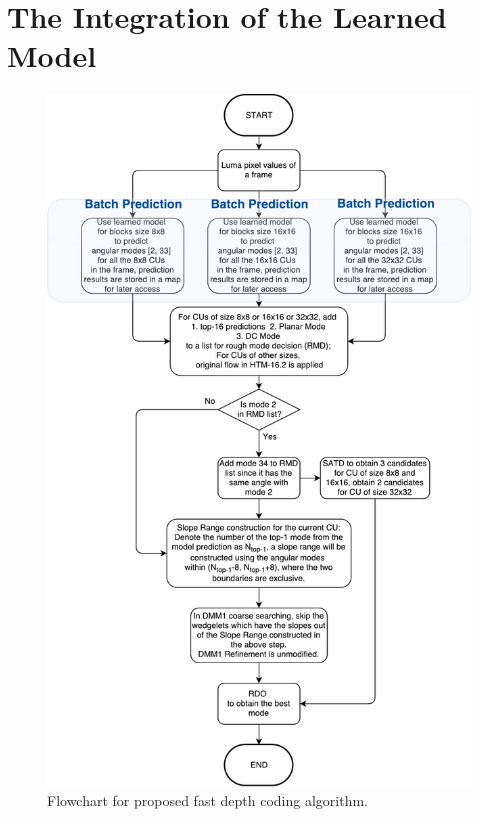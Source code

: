 \section{The Integration of the Learned Model}\label{sec:integration-of-learned-model}
\begin{figure}
    \centering
    \includegraphics[width=\textwidth,height=\textheight,keepaspectratio]{Figures/proposed-fast-depth-coding-algorithm}
    \caption[Flowchart for proposed fast depth coding 
    algorithm]{Flowchart for proposed fast depth coding 
    algorithm.}\label{fig:proposed-fast-depth-coding-algorithm}
\end{figure}
